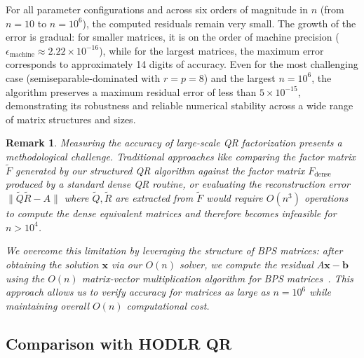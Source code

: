 \documentclass[a4paper,fleqn]{cas-sc}
\newtheorem{remark}{Remark}[section]
\begin{document}
For all parameter configurations and across six orders of magnitude in $n$ (from $n=10$ to $n=10^6$), the computed residuals remain very small. The growth of the error is gradual: for smaller matrices, it is on the order of machine precision ($ \epsilon_{\mathrm{machine}} \approx 2.22 \times 10^{-16}$), while for the largest matrices, the maximum error corresponds to approximately 14 digits of accuracy. Even for the most challenging case (semiseparable-dominated with $r=p=8$) and the largest $n=10^6$, the algorithm preserves a maximum residual error of less than $5 \times 10^{-15}$, demonstrating its robustness and reliable numerical stability across a wide range of matrix structures and sizes.


\begin{remark}
Measuring the accuracy of large-scale QR factorization presents a methodological challenge. Traditional approaches like comparing the factor matrix $\tilde{F}$ generated by our structured QR algorithm against the factor matrix $F_{\text{dense}}$ produced by a standard dense QR routine, or evaluating the reconstruction error $\|\tilde{Q}\tilde{R} - A\|$ where $\tilde{Q},\tilde{R}$ are extracted from $\tilde{F}$ would require $O(n^3)$ operations to compute the dense equivalent matrices and therefore becomes infeasible for $n > 10^4$.

We overcome this limitation by leveraging the structure of BPS matrices: after obtaining the solution $\mathbf{x}$ via our $O(n)$ solver, we compute the residual $A\mathbf{x} - \mathbf{b}$ using the $O(n)$ matrix-vector multiplication algorithm for BPS matrices~\citep{chandrasekaran2002fast}. This approach allows us to verify accuracy for matrices as large as $n=10^6$ while maintaining overall $O(n)$ computational cost.
\end{remark}

\subsection{Comparison with HODLR QR}
\end{document}
